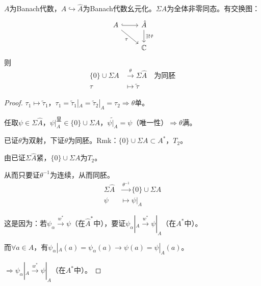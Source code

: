\documentclass[lang=cn,a4paper,newtx,section]{elegantbook}
\begin{document}
\begin{lemma}
  $A$为Banach代数，$A \hookrightarrow \hat{A}$为Banach代数幺元化。$\Sigma A$为全体非零同态。有交换图：
  \begin{equation*}
    \begin{tikzcd}
      A \arrow[r, hook] \arrow[rd, "\tau"'] & \hat{A} \arrow[d, "\exists! \tilde{\tau}"] \\
      & \mathbb{C}
    \end{tikzcd}
  \end{equation*}
  则
  \begin{equation*}
    \begin{aligned}
      \{0\} \cup \Sigma A &\xrightarrow{\theta} \Sigma\hat{A} \quad \text{为同胚} \\
      \tau &\longmapsto \tilde{\tau}
    \end{aligned}
  \end{equation*}
\end{lemma}

\begin{proof}
  $\tau_1 \longmapsto \tilde{\tau}_1$，$\tau_1 = \tilde{\tau}_1|_A = \tilde{\tau}_2|_A = \tau_2 \Rightarrow \theta$单。
  
  任取$\psi \in \Sigma\hat{A}$，$\psi|_A^{\text{显}} \in \{0\} \cup \Sigma A$，$\widetilde{\psi|_A} = \psi$（唯一性）$\Rightarrow \theta$满。
  
  已证$\theta$为双射，下证$\theta$为同胚。Rmk：$\{0\} \cup \Sigma A \subset A^*$，$T_2$。
  
  由已证$\Sigma\hat{A}$紧，$\{0\} \cup \Sigma A$为$T_2$。
  
  从而只要证$\theta^{-1}$为连续，从而同胚。
  \begin{equation*}
    \begin{aligned}
      \Sigma\hat{A} &\xrightarrow{\theta^{-1}} \{0\} \cup \Sigma A \\
      \psi &\longmapsto \psi|_A
    \end{aligned}
  \end{equation*}
  
  这是因为：若$\psi_\alpha \xrightarrow{w^*} \psi$（在$\hat{A}^*$中），要证$\psi_\alpha|_A \xrightarrow{w^*} \psi|_A$（在$A^*$中）。
  
  而$\forall a \in A$，有$\psi_\alpha|_A(a) = \psi_\alpha(a) \longrightarrow \psi(a) = \psi|_A(a)$。
  
  $\Rightarrow \psi_\alpha|_A \xrightarrow{w^*} \psi|_A$（在$A^*$中）。
\end{proof}
\end{document}
